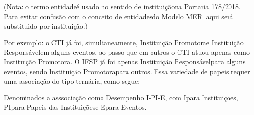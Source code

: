 \documentclass[
12pt,		%
openright,	%
twoside,  %
a4paper,			%
chapter=TITLE,		%
english,			%
french,				%
spanish,			%
brazil				%
]{USPSC-classe/USPSC}
\begin{document}
(Nota: o termo \textquotedbl entidade\textquotedbl  \'e usado no sentido de \textquotedbl institui\c{c}\~ao\textquotedbl  na Portaria 178/2018. Para evitar confus\~ao com o conceito de \textquotedbl entidades\textquotedbl  do Modelo MER, aqui ser\'a substitu\'{\i}do por \textquotedbl institui\c{c}\~ao\textquotedbl .)














Por exemplo: o CTI j\'a foi, simultaneamente, \textquotedbl Institui\c{c}\~ao Promotora\textquotedbl  e \textquotedbl Institui\c{c}\~ao Respons\'avel\textquotedbl  em alguns eventos, ao passo que em outros o CTI atuou apenas como \textquotedbl Institui\c{c}\~ao Promotora\textquotedbl . O IFSP j\'a foi apenas \textquotedbl Institui\c{c}\~ao Respons\'avel\textquotedbl  para alguns eventos, sendo \textquotedbl Institui\c{c}\~ao Promotora\textquotedbl  para outros. Essa variedade de papeis requer uma associa\c{c}\~ao do tipo tern\'aria, como segue:
















Denominados a asssocia\c{c}\~ao como \textquotedbl Desempenho I-PI-E\textquotedbl , com \textquotedbl I\textquotedbl  para Institui\c{c}\~oes, \textquotedbl PI\textquotedbl  para \textquotedbl Papeis das Institui\c{c}\~oes\textquotedbl  e \textquotedbl E\textquotedbl  para \textquotedbl Eventos\textquotedbl .
\end{document}

